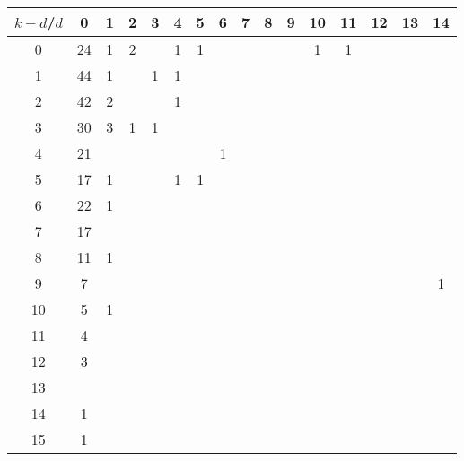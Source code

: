 \documentclass{article}
\begin{document}
\begin{table}[h]\footnotesize
{\centering
\begin{tabular}{|c|c|
c|c|c|c|c|c|c|c|c|c|c|c|c|c|}
  \hline
  $k-d$/$d$ 
 & 0 & 1 & 2 & 3 & 4 & 5 & 6 & 7 & 8 & 9 & 10 & 11 & 12 & 13 & 14\\

  \hline
  \hline

0  & 24 & 1 & 2 &  & 1 & 1 &  &  &  &  & 1 & 1 &  &  & \\

1  & 44 & 1 &  & 1 & 1 &  &  &  &  &  &  &  &  &  & \\

2  & 42 & 2 &  &  & 1 &  &  &  &  &  &  &  &  &  & \\

3  & 30 & 3 & 1 & 1 &  &  &  &  &  &  &  &  &  &  & \\

4  & 21 &  &  &  &  &  & 1 &  &  &  &  &  &  &  & \\

5  & 17 & 1 &  &  & 1 & 1 &  &  &  &  &  &  &  &  & \\

6  & 22 & 1 &  &  &  &  &  &  &  &  &  &  &  &  & \\

7  & 17 &  &  &  &  &  &  &  &  &  &  &  &  &  & \\

8  & 11 & 1 &  &  &  &  &  &  &  &  &  &  &  &  & \\

9  & 7 &  &  &  &  &  &  &  &  &  &  &  &  &  & 1\\

10  & 5 & 1 &  &  &  &  &  &  &  &  &  &  &  &  & \\

11  & 4 &  &  &  &  &  &  &  &  &  &  &  &  &  & \\

12  & 3 &  &  &  &  &  &  &  &  &  &  &  &  &  & \\

13  &  &  &  &  &  &  &  &  &  &  &  &  &  &  & \\

14  & 1 &  &  &  &  &  &  &  &  &  &  &  &  &  & \\

15  & 1 &  &  &  &  &  &  &  &  &  &  &  &  &  & \\


\end{tabular}}
\end{table}
\end{document}
